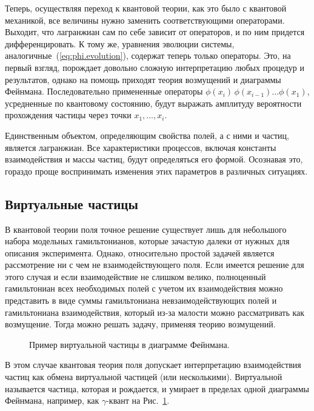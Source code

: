Теперь, осуществляя переход к квантовой теории, как это было с квантовой механикой, все величины нужно заменить соответствующими операторами. 
Выходит, что лагранжиан сам по себе зависит от операторов, и по ним придется дифференцировать. 
К тому же, уравнения эволюции системы, аналогичные~(\ref{eq:phi.evolution}), содержат теперь только операторы. 
Это, на первый взгляд, порождает довольно сложную интерпретацию любых процедур и результатов, однако на помощь приходят теория возмущений и диаграммы Фейнмана. 
Последовательно примененные операторы $\phi(x_i)\,\phi(x_{i-1})\ldots\phi(x_1)$, усредненные по квантовому состоянию, будут выражать амплитуду вероятности прохождения частицы через точки $x_1, \ldots, x_i$.

Единственным объектом, определяющим свойства полей, а с ними и частиц, является лагранжиан. 
Все характеристики процессов, включая константы взаимодействия и массы частиц, будут определяться его формой. 
Осознавая это, гораздо проще воспринимать изменения этих параметров в различных ситуациях. 


\subsection{Виртуальные частицы}

В квантовой теории поля точное решение существует лишь для небольшого набора модельных гамильтонианов, которые зачастую далеки от нужных для описания эксперимента. 
Однако, относительно простой задачей является рассмотрение ни с чем не взаимодействующего поля. 
Если имеется решение для этого случая и если взаимодействие не слишком велико, полноценный гамильтониан всех необходимых полей с учетом их взаимодействия можно представить в виде суммы гамильтониана невзаимодействующих полей и гамильтониана взаимодействия, который из-за малости можно рассматривать как возмущение. 
Тогда можно решать задачу, применяя теорию возмущений. 

\begin{figure}
\def\svgwidth{.5\linewidth}

\caption{Пример виртуальной частицы в диаграмме Фейнмана.}
\label{fig:VirGamma}
\end{figure}

В этом случае квантовая теория поля допускает интерпретацию взаимодействия частиц как обмена виртуальной частицей (или несколькими). 
Виртуальной называется частица, которая и рождается, и умирает в пределах одной диаграммы Фейнмана, например, как $\gamma$-квант на Рис.~\ref{fig:VirGamma}. 

